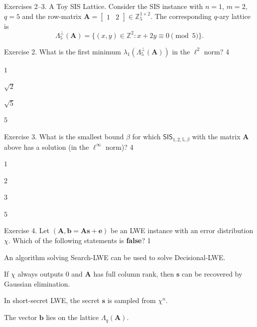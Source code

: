 \documentclass[../../book.tex]{subfiles}
\begin{document}
\begin{exbox}{Exercises 2--3. A Toy SIS Lattice.}
    Consider the SIS instance with $n=1$, $m=2$, $q=5$ and the row-matrix $\mathbf{A} = \begin{bmatrix} 1 & 2 \end{bmatrix} \in \mathbb{Z}_5^{1 \times 2}$.
    The corresponding $q$-ary lattice is
    \begin{equation*}
        \Lambda^{\perp}_5(\mathbf{A}) = \{(x,y) \in \mathbb{Z}^2: x + 2y \equiv 0 \pmod 5\}.
    \end{equation*}
\end{exbox}
 
\begin{xexercise}
    {Exercise 2.}
    {What is the first minimum $\lambda_1(\Lambda^{\perp}_5(\mathbf{A}))$ in the $\ell^2$ norm?}
    {4}
    {
        \item $1$
        \item $\sqrt{2}$
        \item $\sqrt{5}$
        \item $5$
    }
\end{xexercise}
 
\begin{xexercise}
    {Exercise 3.}
    {What is the smallest bound $\beta$ for which $\mathsf{SIS}_{1,2,5,\beta}$ with the matrix $\mathbf{A}$ above has a solution (in the $\ell^{\infty}$ norm)?}
    {4}
    {
        \item $1$
        \item $2$
        \item $3$
        \item $5$
    }
\end{xexercise}
 
\begin{xexercise}
    {Exercise 4.}
    {Let $(\mathbf{A},\mathbf{b} = \mathbf{A}\mathbf{s}+\mathbf{e})$ be an LWE instance with an error distribution $\chi$. Which of the following statements is \textbf{false}?}
    {1}
    {
        \item An algorithm solving Search-LWE can be used to solve Decisional-LWE.
        \item If $\chi$ always outputs $0$ and $\mathbf{A}$ has full column rank, then $\mathbf{s}$ can be recovered by Gaussian elimination.
        \item In short-secret LWE, the secret $\mathbf{s}$ is sampled from $\chi^n$.
        \item The vector $\mathbf{b}$ lies on the lattice $\Lambda_q(\mathbf{A})$.
    }
\end{xexercise}
 
\end{document}
